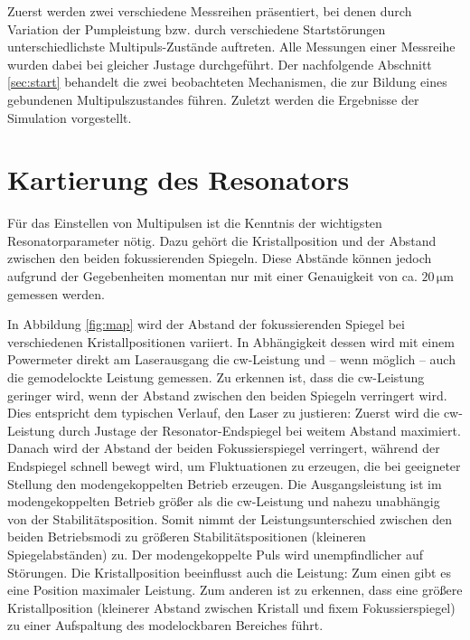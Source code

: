 \documentclass[bachelor,       %
               twoside,        %
               BCOR10mm,       %
               liststotoc,nomtotoc,bibtotoc, %
               english,ngerman, %
               final,          %
               ]{GAUBM}
\begin{document}
Zuerst werden zwei verschiedene Messreihen präsentiert, bei denen durch Variation der Pumpleistung bzw. durch verschiedene Startstörungen unterschiedlichste Multipuls-Zustände auftreten.
Alle Messungen einer Messreihe wurden dabei bei gleicher Justage durchgeführt.
Der nachfolgende Abschnitt \ref{sec:start} behandelt die zwei beobachteten Mechanismen, die zur Bildung eines gebundenen Multipulszustandes führen.
Zuletzt werden die Ergebnisse der Simulation vorgestellt.

\section{Kartierung des Resonators}
Für das Einstellen von Multipulsen ist die Kenntnis der wichtigsten Resonatorparameter nötig.
Dazu gehört die Kristallposition und der Abstand zwischen den beiden fokussierenden Spiegeln.
Diese Abstände können jedoch aufgrund der Gegebenheiten momentan nur mit einer Genauigkeit von ca. $20\,\si{\micro\meter}$ gemessen werden.

In Abbildung \ref{fig:map} wird der Abstand der fokussierenden Spiegel bei verschiedenen Kristallpositionen variiert.
In Abhängigkeit dessen wird mit einem Powermeter direkt am Laserausgang die cw-Leistung und -- wenn möglich -- auch die gemodelockte Leistung gemessen.
Zu erkennen ist, dass die cw-Leistung geringer wird, wenn der Abstand zwischen den beiden Spiegeln verringert wird.
Dies entspricht dem typischen Verlauf, den Laser zu justieren:
Zuerst wird die cw-Leistung durch Justage der Resonator-Endspiegel bei weitem Abstand maximiert.
Danach wird der Abstand der beiden Fokussierspiegel verringert, während der Endspiegel schnell bewegt wird, um Fluktuationen zu erzeugen, die bei geeigneter Stellung den modengekoppelten Betrieb erzeugen.
Die Ausgangsleistung ist im modengekoppelten Betrieb größer als die cw-Leistung und nahezu unabhängig von der Stabilitätsposition.
Somit nimmt der Leistungsunterschied zwischen den beiden Betriebsmodi zu größeren Stabilitätspositionen (kleineren Spiegelabständen) zu.
Der modengekoppelte Puls wird unempfindlicher auf Störungen.
Die Kristallposition beeinflusst auch die Leistung: Zum einen gibt es eine Position maximaler Leistung.
Zum anderen ist zu erkennen, dass eine größere Kristallposition (kleinerer Abstand zwischen Kristall und fixem Fokussierspiegel) zu einer Aufspaltung des modelockbaren Bereiches führt.
\end{document}
